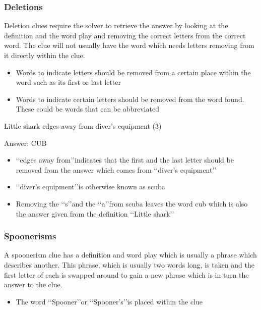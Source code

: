 \subsubsection{Deletions}

Deletion clues require the solver to retrieve the answer by looking at the definition and the word play and removing the correct letters from the correct word. The clue will not usually have the word which needs letters removing from it directly within the clue.  

\begin{itemize}
 	\item Words to indicate letters should be removed from a certain place within the word such as its first or last letter 
	\item Words to indicate certain letters should be removed from the word found. These could be words that can be abbreviated 
\end{itemize}


Little shark edges away from diver's equipment (3)  

Answer: CUB 

\begin{itemize}
	\item \lq\lq edges away from\rq\rq indicates that the first and the last letter should be removed from the answer which comes from \lq\lq diver’s equipment\rq\rq
	\item \lq\lq diver’s equipment\rq\rq is otherwise known as scuba  
	\item Removing the \lq\lq s\rq\rq and the \lq\lq a\rq\rq from scuba leaves the word cub which is also the answer given from the definition \lq\lq Little shark\rq\rq
\end{itemize}

\subsubsection{Spoonerisms}

A spoonerism clue has a definition and word play which is usually a phrase which describes another. This phrase, which is usually two words long, is taken and the first letter of each is swapped around to gain a new phrase which is in turn the answer to the clue.  

\begin{itemize} 
	\item The word \lq\lq Spooner\rq\rq or \lq\lq Spooner’s\rq\rq is placed within the clue 
\end{itemize}

